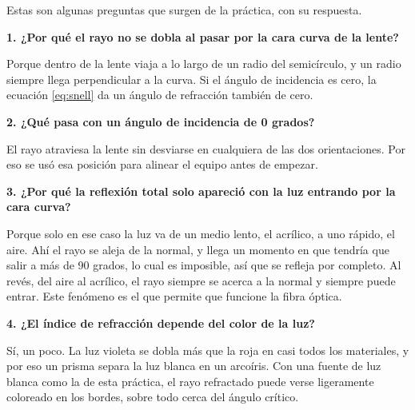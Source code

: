Estas son algunas preguntas que surgen de la práctica, con su respuesta.

\textbf{1. ¿Por qué el rayo no se dobla al pasar por la cara curva de la lente?}

Porque dentro de la lente viaja a lo largo de un radio del semicírculo, y un radio siempre llega perpendicular a la curva. Si el ángulo de incidencia es cero, la ecuación \eqref{eq:snell} da un ángulo de refracción también de cero.

\textbf{2. ¿Qué pasa con un ángulo de incidencia de 0 grados?}

El rayo atraviesa la lente sin desviarse en cualquiera de las dos orientaciones. Por eso se usó esa posición para alinear el equipo antes de empezar.

\textbf{3. ¿Por qué la reflexión total solo apareció con la luz entrando por la cara curva?}

Porque solo en ese caso la luz va de un medio lento, el acrílico, a uno rápido, el aire. Ahí el rayo se aleja de la normal, y llega un momento en que tendría que salir a más de 90 grados, lo cual es imposible, así que se refleja por completo. Al revés, del aire al acrílico, el rayo siempre se acerca a la normal y siempre puede entrar. Este fenómeno es el que permite que funcione la fibra óptica.

\textbf{4. ¿El índice de refracción depende del color de la luz?}

Sí, un poco. La luz violeta se dobla más que la roja en casi todos los materiales, y por eso un prisma separa la luz blanca en un arcoíris. Con una fuente de luz blanca como la de esta práctica, el rayo refractado puede verse ligeramente coloreado en los bordes, sobre todo cerca del ángulo crítico.
